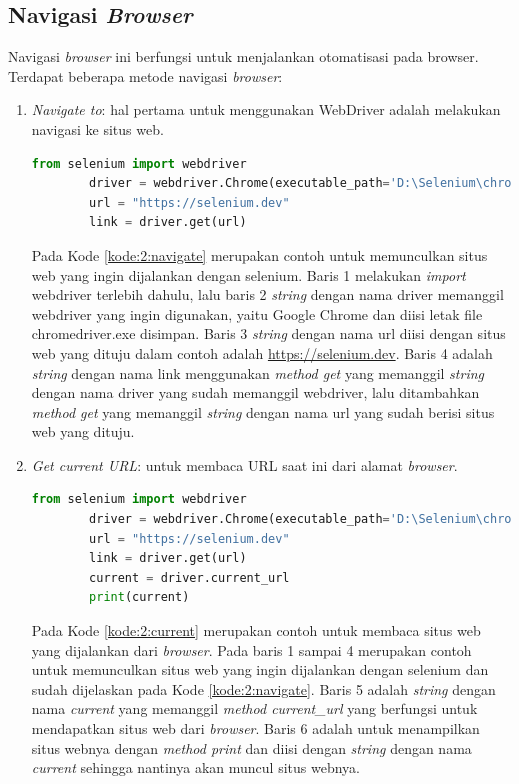 \subsection{Navigasi \textit{Browser}}
Navigasi \textit{browser} ini berfungsi untuk menjalankan otomatisasi pada browser. Terdapat beberapa metode navigasi \textit{browser}:
\begin{enumerate}
	\item \textit{Navigate to}: hal pertama untuk menggunakan WebDriver adalah melakukan navigasi ke situs web.
	\begin{lstlisting}[language=python, caption=Contoh kode Navigate to, label=kode:2:navigate]
		from selenium import webdriver
		driver = webdriver.Chrome(executable_path='D:\Selenium\chromedriver.exe')
		url = "https://selenium.dev"
		link = driver.get(url)
	\end{lstlisting}
	Pada Kode \ref{kode:2:navigate} merupakan contoh untuk memunculkan situs web yang ingin dijalankan dengan selenium. Baris 1 melakukan \textit{import} webdriver terlebih dahulu, lalu baris 2 \textit{string} dengan nama driver memanggil webdriver yang ingin digunakan, yaitu Google Chrome dan diisi letak file chromedriver.exe disimpan. Baris 3 \textit{string} dengan nama url diisi dengan situs web yang dituju dalam contoh adalah \url{https://selenium.dev}. Baris 4 adalah \textit{string} dengan nama link menggunakan \textit{method get} yang memanggil \textit{string} dengan nama driver yang sudah memanggil webdriver, lalu ditambahkan \textit{method get} yang memanggil \textit{string} dengan nama url yang sudah berisi situs web yang dituju.\\ 
	\item \textit{Get current URL}: untuk membaca URL saat ini dari alamat \textit{browser}.
	\begin{lstlisting}[language=python, caption=Contoh kode Get current URL, label=kode:2:current]
		from selenium import webdriver
		driver = webdriver.Chrome(executable_path='D:\Selenium\chromedriver.exe')
		url = "https://selenium.dev"
		link = driver.get(url)
		current = driver.current_url
		print(current)
	\end{lstlisting}
	Pada Kode \ref{kode:2:current} merupakan contoh untuk membaca situs web yang dijalankan dari \textit{browser}. Pada baris 1 sampai 4 merupakan contoh untuk memunculkan situs web yang ingin dijalankan dengan selenium dan sudah dijelaskan pada Kode \ref{kode:2:navigate}. Baris 5 adalah \textit{string} dengan nama \textit{current} yang memanggil \textit{method current\_url} yang berfungsi untuk mendapatkan situs web dari \textit{browser}. Baris 6 adalah untuk menampilkan situs webnya dengan \textit{method print} dan diisi dengan \textit{string} dengan nama \textit{current} sehingga nantinya akan muncul situs webnya.\\ 

\end{enumerate}
